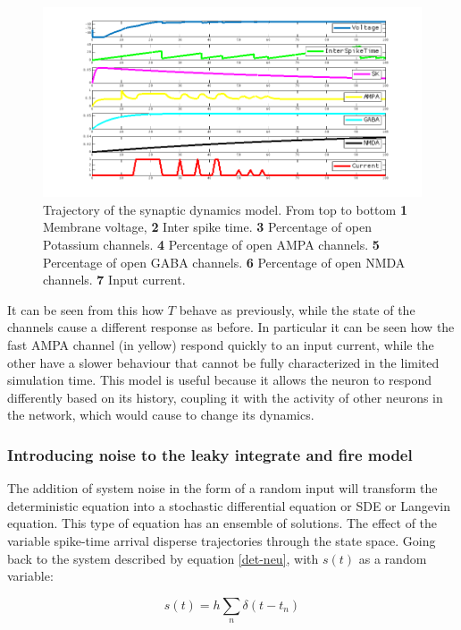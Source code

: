 		\begin{figure}
			\includegraphics[width=\textwidth]{Figures/synapse}
			\caption{Trajectory of the synaptic dynamics model. From top to bottom \textbf{1} Membrane voltage, \textbf{2} Inter spike time. \textbf{3} Percentage of open Potassium channels. \textbf{4} Percentage of open AMPA channels. \textbf{5} Percentage of open GABA channels. \textbf{6} Percentage of open NMDA channels. \textbf{7} Input current.}
			\label{fig:synapses}
		\end{figure}

		It can be seen from this how $T$ behave as previously, while the state of the channels cause a different response as before.
		In particular it can be seen how the fast AMPA channel (in yellow) respond quickly to an input current, while the other have a slower behaviour that cannot be fully characterized in the limited simulation time.
		This model is useful because it allows the neuron to respond differently based on its history, coupling it with the activity of other neurons in the network, which would cause to change its dynamics.

		\subsubsection{Introducing noise to the leaky integrate and fire model}
		The addition of system noise in the form of a random input will transform the deterministic equation into a stochastic differential equation or SDE or Langevin equation.
		This type of equation has an ensemble of solutions.
		The effect of the variable spike-time arrival disperse trajectories through the state space.
		Going back to the system described by equation \ref{det-neu}, with $s(t)$ as a random variable:

		\begin{equation}
			s(t) = h\sum\limits_n\delta(t-t_n)
		\end{equation}

